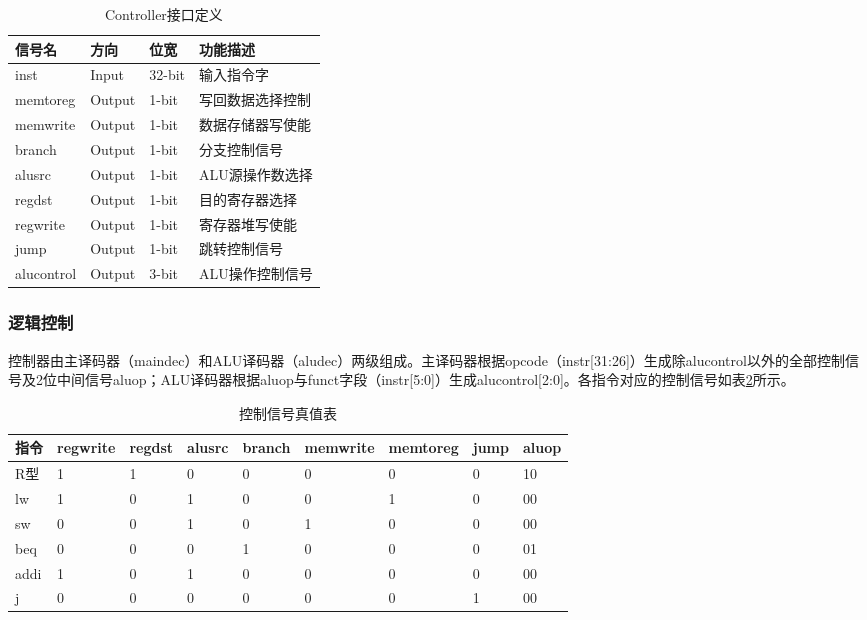 \begin{table}[htp]
\caption{Controller接口定义}\label{tab:controller}
\begin{center}
\begin{tabular}{|l|l|l|p{6cm}|}
\hline
\textbf{信号名} & \textbf{方向} & \textbf{位宽} & \textbf{功能描述}\\ \hline \hline
inst       & Input  & 32-bit & 输入指令字 \\ \hline
memtoreg   & Output & 1-bit  & 写回数据选择控制 \\ \hline
memwrite   & Output & 1-bit  & 数据存储器写使能 \\ \hline
branch     & Output & 1-bit  & 分支控制信号 \\ \hline
alusrc     & Output & 1-bit  & ALU源操作数选择 \\ \hline
regdst     & Output & 1-bit  & 目的寄存器选择 \\ \hline
regwrite   & Output & 1-bit  & 寄存器堆写使能 \\ \hline
jump       & Output & 1-bit  & 跳转控制信号 \\ \hline
alucontrol & Output & 3-bit  & ALU操作控制信号 \\ \hline
\end{tabular}
\end{center}
\end{table}

\subsubsection{逻辑控制}
控制器由主译码器（maindec）和ALU译码器（aludec）两级组成。主译码器根据opcode（instr[31:26]）生成除alucontrol以外的全部控制信号及2位中间信号aluop；ALU译码器根据aluop与funct字段（instr[5:0]）生成alucontrol[2:0]。各指令对应的控制信号如表\ref{tab:truth}所示。

\begin{table}[htp]
\caption{控制信号真值表}\label{tab:truth}
\begin{center}
\begin{tabular}{|l|l|l|l|l|l|l|l|l|}
\hline
\textbf{指令} & \textbf{regwrite} & \textbf{regdst} & \textbf{alusrc} & \textbf{branch} & \textbf{memwrite} & \textbf{memtoreg} & \textbf{jump} & \textbf{aluop} \\ \hline \hline
R型   & 1 & 1 & 0 & 0 & 0 & 0 & 0 & 10 \\ \hline
lw    & 1 & 0 & 1 & 0 & 0 & 1 & 0 & 00 \\ \hline
sw    & 0 & 0 & 1 & 0 & 1 & 0 & 0 & 00 \\ \hline
beq   & 0 & 0 & 0 & 1 & 0 & 0 & 0 & 01 \\ \hline
addi  & 1 & 0 & 1 & 0 & 0 & 0 & 0 & 00 \\ \hline
j     & 0 & 0 & 0 & 0 & 0 & 0 & 1 & 00 \\ \hline
\end{tabular}
\end{center}
\end{table}
